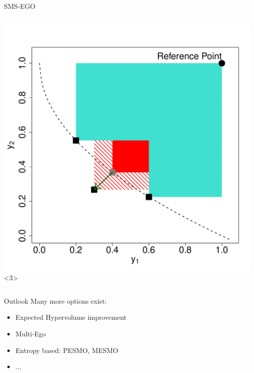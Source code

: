 \documentclass[11pt,compress,t,notes=noshow, xcolor=table]{beamer}
\begin{document}
\begin{frame}{SMS-EGO}
\begin{columns}
\begin{column}{0.45\textwidth}
\includegraphics[page = 1]{figure_man/sms_plot.pdf}<3>

\end{column}

\end{columns}
\end{frame}

\begin{frame}{Outlook}
Many more options exist:
\begin{itemize}
  \item Expected Hypervolume improvement
  \item Multi-Ego
  \item Entropy based: PESMO, MESMO
  \item ...
\end{itemize}

\end{frame}


\endlecture
\end{document}
